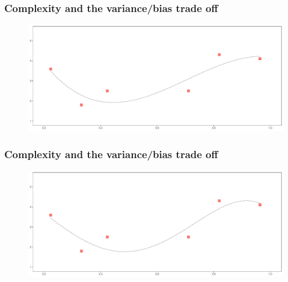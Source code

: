 \documentclass[
  shownotes,
  xcolor={svgnames},
  hyperref={colorlinks,citecolor=DarkBlue,linkcolor=DarkRed,urlcolor=DarkBlue}
  , aspectratio=169]{beamer}
\begin{document}
\begin{frame}
\frametitle{Complexity and the variance/bias trade off}


        \begin{figure}[H] \centering
            \captionsetup{justification=centering}
              \includegraphics[scale=0.4]{figures/fig_1d.pdf}
 \end{figure}

\end{frame}
\begin{frame}
\frametitle{Complexity and the variance/bias trade off}


        \begin{figure}[H] \centering
            \captionsetup{justification=centering}
              \includegraphics[scale=0.4]{figures/fig_1e.pdf}
 \end{figure}

\end{frame}
\end{document}
